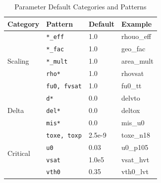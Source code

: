 \documentclass[conference]{IEEEtran}
\begin{document}
\begin{table}[!t]
\caption{Parameter Default Categories and Patterns}
\label{tab:default_categories}
\centering
\renewcommand{\arraystretch}{1.2}
\begin{tabular}{@{}llll@{}}
\toprule
\textbf{Category} & \textbf{Pattern} & \textbf{Default} & \textbf{Example} \\
\midrule
\multirow{5}{*}{Scaling} & \texttt{*\_eff} & 1.0 & rhouo\_eff \\
 & \texttt{*\_fac} & 1.0 & geo\_fac \\
 & \texttt{*\_mult} & 1.0 & area\_mult \\
 & \texttt{rho*} & 1.0 & rhovsat \\
 & \texttt{fu0, fvsat} & 1.0 & fu0\_tt \\
\midrule
\multirow{3}{*}{Delta} & \texttt{d*} & 0.0 & delvto \\
 & \texttt{del*} & 0.0 & deltox \\
 & \texttt{mis*} & 0.0 & mis\_u0 \\
\midrule
\multirow{4}{*}{Critical} & \texttt{toxe, toxp} & 2.5e-9 & toxe\_n18 \\
 & \texttt{u0} & 0.03 & u0\_p105 \\
 & \texttt{vsat} & 1.0e5 & vsat\_hvt \\
 & \texttt{vth0} & 0.35 & vth0\_lvt \\
\bottomrule
\end{tabular}
\end{table}
\end{document}
